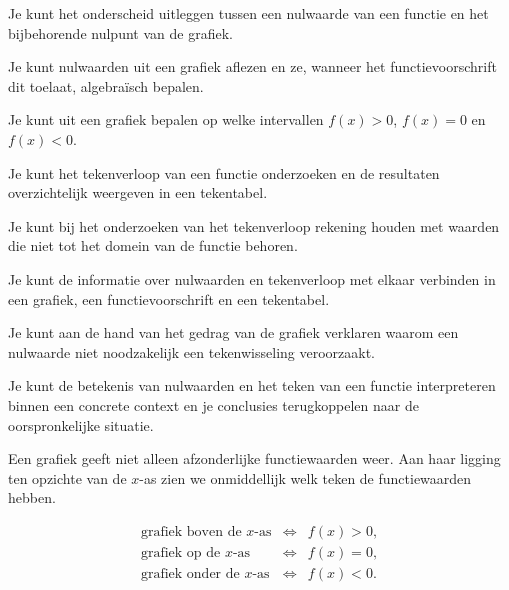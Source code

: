 \documentclass{ximera}
\begin{document}
  \begin{leerdoelen}
  
    \item Je kunt het onderscheid uitleggen tussen een nulwaarde van een functie en het bijbehorende nulpunt van de grafiek.
  
    \item Je kunt nulwaarden uit een grafiek aflezen en ze, wanneer het functievoorschrift dit toelaat, algebraïsch bepalen.
  
    \item Je kunt uit een grafiek bepalen op welke intervallen \(f(x)>0\), \(f(x)=0\) en \(f(x)<0\).
  
    \item Je kunt het tekenverloop van een functie onderzoeken en de resultaten overzichtelijk weergeven in een tekentabel.
  
    \item Je kunt bij het onderzoeken van het tekenverloop rekening houden met waarden die niet tot het domein van de functie behoren.
  
    \item Je kunt de informatie over nulwaarden en tekenverloop met elkaar verbinden in een grafiek, een functievoorschrift en een tekentabel.
  
    \item Je kunt aan de hand van het gedrag van de grafiek verklaren waarom een nulwaarde niet noodzakelijk een tekenwisseling veroorzaakt.
  
    \item Je kunt de betekenis van nulwaarden en het teken van een functie interpreteren binnen een concrete context en je conclusies terugkoppelen naar de oorspronkelijke situatie.
  
  \end{leerdoelen}




Een grafiek geeft niet alleen afzonderlijke functiewaarden weer. Aan haar ligging ten opzichte van de \(x\)-as zien we onmiddellijk welk teken de functiewaarden hebben.

\[
\begin{array}{ccl}
\text{grafiek boven de \(x\)-as}
&\Longleftrightarrow& f(x)>0,\\[2mm]
\text{grafiek op de \(x\)-as}
&\Longleftrightarrow& f(x)=0,\\[2mm]
\text{grafiek onder de \(x\)-as}
&\Longleftrightarrow& f(x)<0.
\end{array}
\]
\end{document}
